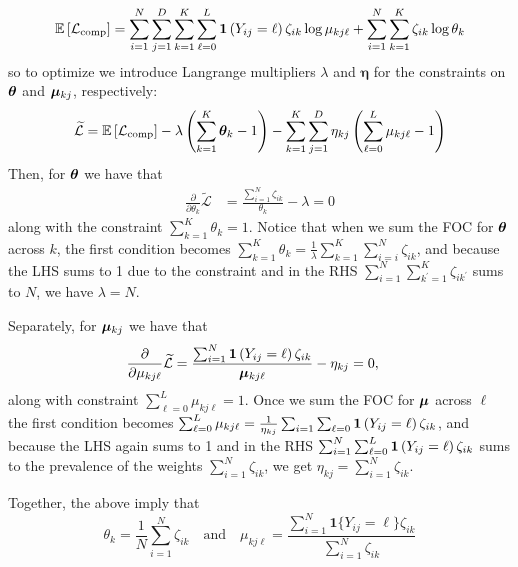\documentclass[11pt]{article}
\begin{document}
\begin{align*}
\mathbb{E}\left[\mathcal{L}_{\text{comp}}\right] = \sum^{N}_{i=1}\sum^{D}_{j=1}\sum^{K}_{k=1}\sum^{L}_{\ell = 0}\bm{1}\left(Y_{ij} = \ell\right) \zeta_{ik}\log\mu_{kj\ell} +  
\sum^{N}_{i=1}\sum^{K}_{k=1}\zeta_{ik}\log \theta_{k}
\end{align*}
so to optimize we introduce Langrange multipliers \(\lambda\) and \(\bm{\eta}\) for the constraints on \(\bm{\theta}\) and \(\bm{\mu}_{kj}\), respectively:
\begin{align}
\widetilde{\mathcal{L}} = \mathbb{E}\left[\mathcal{L}_\text{comp}\right] - \lambda\left(\sum^{K}_{k=1}\bm{\theta}_k - 1\right) - \sum^{K}_{k=1}\sum^{D}_{j=1}\eta_{kj}\left(\sum^{L}_{\ell=0}\mu_{kj\ell} - 1\right)\label{eq:lagrange_a}
\end{align}
Then, for \(\bm{\theta}\) we have that
\begin{align*}
\frac{\partial}{\partial {\theta}_{k}}\widetilde{\mathcal{L}}
&= \frac{\sum^{N}_{i=1}\zeta_{ik}}{{\theta}_{k}} - \lambda  = 0
\end{align*}
along with the constraint \(\sum^K_{k=1}\theta_k = 1\). Notice that when we sum the FOC for \(\bm{\theta}\) across \(k\), the first condition becomes \(\sum^K_{k=1}\theta_k = \frac{1}{\lambda}\sum^K_{k = 1}\sum^N_{i=i}\zeta_{ik}\), and because the LHS sums to 1 due to the constraint and in the RHS  \(\sum^{N}_{i=1}\sum^{K}_{k^\prime =1}\zeta_{ik^\prime}\) sums to \(N\), we have \(\lambda = N\). 

\medskip

Separately, for \(\bm{\mu}_{kj}\) we have that
\begin{align*}
\frac{\partial}{\partial {\mu}_{kj\ell}}\widetilde{\mathcal{L}}
&= \frac{\sum^{N}_{i=1}\bm{1}\left(Y_{ij} = \ell\right)\zeta_{ik}}{\bm{\mu}_{kj\ell}} - \eta_{kj}  = 0,
\end{align*}
along with constraint \(\sum^L_{\ell = 0} \mu_{kj\ell} = 1\). Once we sum the FOC for \(\bm{\mu}\) across \(\ell\) the first condition becomes  \(\sum^L_{\ell=0} \mu_{kj\ell} = \frac{1}{\eta_{kj}}\sum_{i=1}\sum_{\ell=0}\bm{1}\left(Y_{ij} = \ell\right)\zeta_{ik}\), and because the LHS again sums to 1 and in the RHS   \(\sum^{N}_{i=1}\sum^{L}_{\ell = 0}\bm{1}\left(Y_{ij} = \ell\right)\zeta_{ik}\) sums to the prevalence of the weights \(\sum^{N}_{i=1}\zeta_{ik}\), we get \(\eta_{kj}= \sum^{N}_{i=1}\zeta_{ik}\).
\medskip

Together, the above imply that
\begin{equation}
\theta_{k} = \frac{1}{N}\sum^{N}_{i=1}\zeta_{ik}\quad
\text{and}\quad
\mu_{kj\ell} =
\frac{\sum^{N}_{i=1}\bm{1}\{Y_{ij} = \ell\}\zeta_{ik}}{\sum^{N}_{i=1}\zeta_{ik}}
\end{equation}
\end{document}
